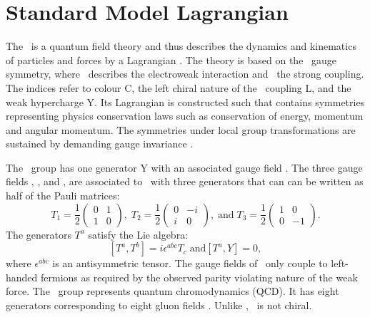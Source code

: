 \section{Standard Model Lagrangian}
\label{sec:SMlagr}
The \SM\ is a quantum field theory and thus describes the dynamics and kinematics of particles and forces by a Lagrangian \Lagr. The theory is based on the \SSU\ gauge symmetry, where \SU\ describes the electroweak interaction and \Sthree\ the strong coupling. The indices refer to colour C, the left chiral nature of the \Stwo\ coupling L, and the weak hypercharge Y. Its Lagrangian is constructed such that contains symmetries representing physics conservation laws such as conservation of energy, momentum and angular momentum. The symmetries under local group transformations are sustained by demanding gauge invariance {}. 



The \Uone\ group has one generator Y with an associated gauge field \Bfield. The three gauge fields \Wfieldone, \Wfieldtwo, and \Wfieldthree, are associated to \Stwo\ with three generators that can can  be written as half of the Pauli matrices: 
\begin{equation}
T_1 =  \frac{1}{2}
\begin{pmatrix}
0  &  1      \\
1  & 0      
\end{pmatrix}, \;
T_2= \frac{1}{2}
\begin{pmatrix}
0  &  -i     \\
i  &  0      
\end{pmatrix},\;\mathrm{ and } \;
 T_3= \frac{1}{2}
 \begin{pmatrix}
 1  &  0     \\
 0  &  -1 
 \end{pmatrix}.
\end{equation}
The generators $T^a$ satisfy the Lie algebra: 
\begin{equation}
 \left[T^a,T^b\right] = i \epsilon^{abc} T_c \; \mathrm{ and } \left[T^a, Y\right] = 0, 
\end{equation}
where $\epsilon^{abc}$ is an antisymmetric tensor. The gauge fields of \Stwo\ only couple to left-handed fermions as required by the observed parity violating nature of the weak force. The \Sthree\ group represents quantum chromodynamics (QCD). It  has eight generators corresponding to eight gluon fields \Gfields. Unlike \SU, \Sthree\ is not chiral. 

